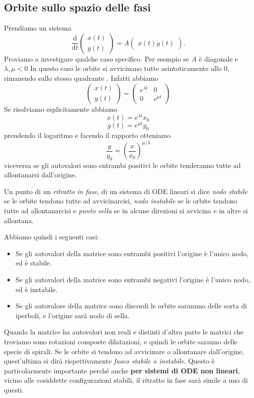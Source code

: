 \documentclass[11pt]{scrartcl}
\newcommand{\dif}{\text{d}}
\begin{document}
	\subsection{Orbite sullo spazio delle fasi}
	Prendiamo un sistema
	$$
	\frac{\dif }{\dif t}
	\begin{pmatrix}
		x(t) \\
		y(t)
	\end{pmatrix}
	= 
	A
	\begin{pmatrix}
		x(t)
		y(t)
	\end{pmatrix}.
	$$
	Proviamo a investigare qualche caso specifico. Per esempio se $A$ è diagonale e $\lambda,\mu<0$
	In questo caso le orbite si avvicinano tutte asintoticamente allo $0$, rimanendo sullo stesso quadrante . Infatti abbiamo
	$$
	\begin{pmatrix}
		x(t) \\
		y(t)
	\end{pmatrix}
	=
	\begin{pmatrix}
		e^{\lambda t} & 0 \\
		0 & e^{\mu t} 
	\end{pmatrix}
	$$  
	Se risolviamo esplicitamente abbiamo
	$$x(t)=e^{\lambda t}x_0$$
	$$y(t)=e^{\mu t}y_0$$
	prendendo il logaritmo e facendo il rapporto otteniamo
	$$\frac{y}{y_0}=\left(\frac{x}{x_0}\right)^{\mu/\lambda}$$
	viceversa se gli autovalori sono entrambi positivi le orbite tenderanno tutte ad allontanarsi dall'origine.
	\begin{definition}
		Un punto di un \textit{ritratto in fase}, di un sistema di ODE lineari si dice \textit{nodo stabile} se le orbite tendono tutte ad avvicinarcisi, \textit{nodo instabile} se le orbite tendono tutte ad allontanarcisi e \textit{punto sella} se in alcune direzioni si avvicina e in altre si allontana.
	\end{definition}
	Abbiamo quindi i seguenti casi:
	\begin{itemize}
		\item Se gli autovalori della matrice sono entrambi positivi l'origine è l'unico nodo, ed è stabile. 
		\item Se gli autovalori della matrice sono entrambi negativi l'origine è l'unico nodo, ed è instabile.
		\item Se gli autovalore della matrice sono discordi le orbite sarannno delle sorta di iperboli, e l'origine sarà nodo di sella.
	\end{itemize}
	Quando la matrice ha autovalori non reali e distinti d'altra parte le matrici che troviamo sono rotazioni composte dilatazioni, e quindi le orbite saranno delle specie di spirali. Se le orbite si tendono ad avvicinare o allontanare dall'origine, quest'ultima si dirà rispettivamente \textit{fuoco stabile o instabile}. Questo è particolarmente importante perché anche \textbf{per sistemi di ODE non lineari}, vicino alle cosiddette configurazioni stabili, il ritratto in fase sarà simile a uno di questi.
\end{document}

